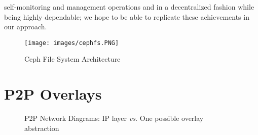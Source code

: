 \documentclass[runningheads]{llncs}
\begin{document}
self-monitoring and management operations and in a decentralized fashion while being highly dependable\cite{ceph_benchmarks}; we hope to be able to replicate these achievements in our approach.

\begin{figure}[h]
    \centering
    \texttt{[image: images/cephfs.PNG]}
    \caption{Ceph File System Architecture \cite{configure-ceph}}
    \label{fig:ceph_arch}
\end{figure}

\newpage\section{P2P Overlays}\label{sec:p2p-overlays}

\begin{figure}[ht]
    \centering
    \hspace{0.2\textwidth}
    \caption{P2P Network Diagrams: IP layer \textit{vs.} One possible overlay abstraction}
    \label{fig:network_diagrams}
\end{figure}
\end{document}
